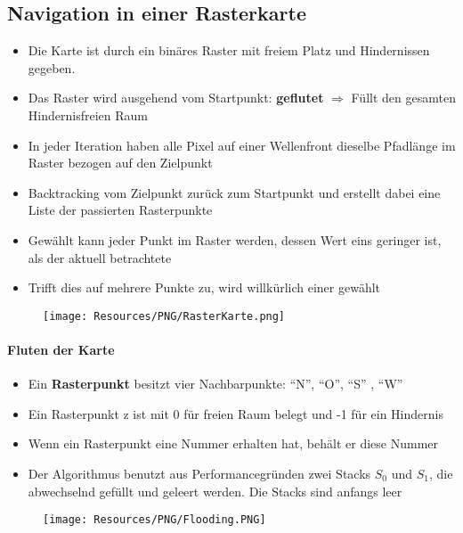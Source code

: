 \subsection{Navigation in einer Rasterkarte}
\begin{itemize}
	\item Die Karte ist durch ein binäres Raster mit freiem Platz und Hindernissen gegeben.
	\item Das Raster wird ausgehend vom Startpunkt: \textbf{geflutet} $\Rightarrow$ Füllt den gesamten Hindernisfreien Raum
	\item In jeder Iteration haben alle Pixel auf einer Wellenfront dieselbe Pfadlänge im Raster bezogen auf den Zielpunkt
	\item Backtracking vom Zielpunkt zurück zum Startpunkt und erstellt dabei eine Liste der passierten Rasterpunkte
	\item Gewählt kann jeder Punkt im Raster werden, dessen Wert eins geringer ist, als der aktuell betrachtete
	\item Trifft dies auf mehrere Punkte zu, wird willkürlich einer gewählt
\end{itemize}
\begin{figure}[H]
	\begin{center}
		\texttt{[image: Resources/PNG/RasterKarte.png]}
		\caption{}
		\label{fig:PNG/RasterKarte.png}
	\end{center}
\end{figure}
\paragraph{Fluten der Karte}
\begin{itemize}
	\item Ein \textbf{Rasterpunkt} besitzt vier Nachbarpunkte: \enquote{N}, \enquote{O}, \enquote{S} , \enquote{W}
	\item Ein Rasterpunkt z ist mit 0 für freien Raum belegt und -1 für ein Hindernis
	\item Wenn ein Rasterpunkt eine Nummer erhalten hat, behält er diese Nummer
	\item Der Algorithmus benutzt aus Performancegründen zwei Stacks $S_0$ und $S_1$, die abwechselnd gefüllt und geleert werden. Die Stacks sind anfangs leer
\end{itemize}
\begin{figure}[H]
	\begin{center}
		\texttt{[image: Resources/PNG/Flooding.PNG]}
		\caption{}
		\label{fig:PNG/Flooding.PNG}
	\end{center}
\end{figure}
